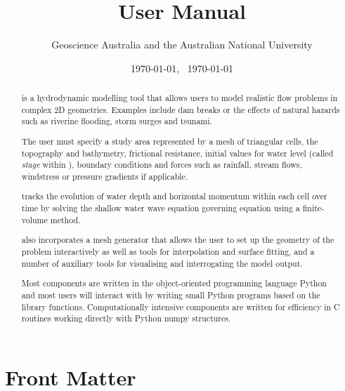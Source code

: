 \documentclass{manual}
\title{\anuga User Manual}
\author{Geoscience Australia and the Australian National University}
\date{\today, \ \currenttime}
\date{\today} %
\begin{document}
\maketitle

\ifhtml
  \chapter*{Front Matter\label{front}}
\fi

%



\begin{abstract}
\label{def:anuga}

\noindent \anuga\index{\anuga} is a hydrodynamic modelling tool that
allows users to model realistic flow problems in complex 2D geometries.
Examples include dam breaks or the effects of natural hazards such
as riverine flooding, storm surges and tsunami.

The user must specify a study area represented by a mesh of triangular
cells, the topography and bathymetry, frictional resistance, initial
values for water level (called \emph{stage} within \anuga),
boundary conditions and forces such as rainfall, stream flows, windstress or pressure gradients if applicable.

\anuga tracks the evolution of water depth and horizontal momentum
within each cell over time by solving the shallow water wave equation
governing equation using a finite-volume method.

\anuga also incorporates a mesh generator that
allows the user to set up the geometry of the problem interactively as
well as tools for interpolation and surface fitting, and a number of
auxiliary tools for visualising and interrogating the model output.

Most \anuga components are written in the object-oriented programming
language Python and most users will interact with \anuga by writing
small Python programs based on the \anuga library
functions. Computationally intensive components are written for
efficiency in C routines working directly with Python numpy structures.

\end{abstract}

\tableofcontents
\end{document}

